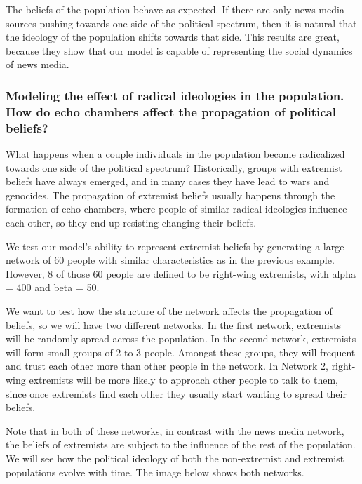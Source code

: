 \documentclass[11pt]{article}
\begin{document}
The beliefs of the population behave as expected. If there are only news media sources pushing towards one side of the political spectrum, then it is natural that the ideology of the population shifts towards that side. This results are great, because they show that our model is capable of representing the social dynamics of news media.

\subsubsection{Modeling the effect of radical ideologies in the population. How do echo chambers affect the propagation of political beliefs?}

What happens when a couple individuals in the population become radicalized towards one side of the political spectrum? Historically, groups with extremist beliefs have always emerged, and in many cases they have lead to wars and genocides. The propagation of extremist beliefs usually happens through the formation of echo chambers, where people of similar radical ideologies influence each other, so they end up resisting changing their beliefs.

We test our model's ability to represent extremist beliefs by generating a large network of 60 people with similar characteristics as in the previous example. However, 8 of those 60 people are defined to be right-wing extremists, with alpha = 400 and beta  = 50.

We want to test how the structure of the network affects the propagation of beliefs, so we will have two different networks. In the first network, extremists will be randomly spread across the population. In the second network, extremists will form small groups of 2 to 3 people. Amongst these groups, they will frequent and trust each other more than other people in the network. In Network 2, right-wing extremists will be more likely to approach other people to talk to them, since once extremists find each other they usually start wanting to spread their beliefs. 

Note that in both of these networks, in contrast with the news media network, the beliefs of extremists are subject to the influence of the rest of the population. We will see how the political ideology of both the non-extremist and  extremist populations evolve with time. The image below shows both networks.
\end{document}

